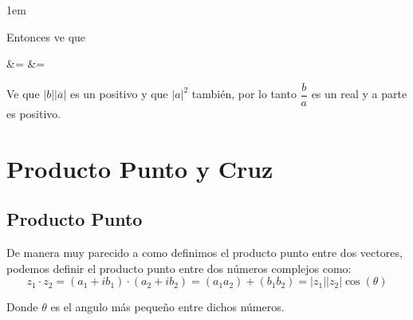 \documentclass[12pt, fleqn]{report}                             %
\newenvironment{SmallIndentation}[1][0.75em]                    %
        {\begin{adjustwidth}{#1}{}\begin{footnotesize}}             %
        {\end{footnotesize}\end{adjustwidth}}                       %
\def \Eq {equation}                                             %
\newenvironment{MultiLineEquation*}[1]                          %
        {\begin{\Eq*}\begin{alignedat}{#1}}                         %
        {\end{alignedat}\end{\Eq*}}                                 %
\newcommand \Over               {\overline}                     %
\theoremstyle{break}                                            %
\newcommand{\Wrap}[1]           {\left( #1 \right)}             %
\newcommand{\Cos}[1] {\cos\Wrap{#1}}                            %
\begin{document}
\begin{itemize}
\begin{SmallIndentation}[1em]
                        Entonces ve que
                        \begin{MultiLineEquation*}{3}
                                &= \dfrac{b \Over{a}}{a \Over{a}} 
                                &= \dfrac{|b||\Over{a}|}{|a|^2}     \\
                        \end{MultiLineEquation*}

                        Ve que $|b||\Over{a}|$ es un positivo y que $|a|^2$ también, por lo tanto
                        $\dfrac{b}{a}$ es un real y a parte es positivo.

                    \end{SmallIndentation}


            \end{itemize}





        \clearpage
        \section{Producto Punto y Cruz}



            \subsection{Producto Punto}

                De manera muy parecido a como definimos el producto punto entre dos
                vectores, podemos definir el producto punto entre dos números complejos
                como:
                \begin{equation}
                    z_1 \cdot z_2
                        = (a_1 + ib_1) \cdot (a_2 + ib_2)
                        = (a_1 a_2) + (b_1 b_2)
                        = |z_1||z_2| \Cos{\theta}
                \end{equation}

                Donde $\theta$ es el angulo más pequeño entre dichos números.
\end{document}
